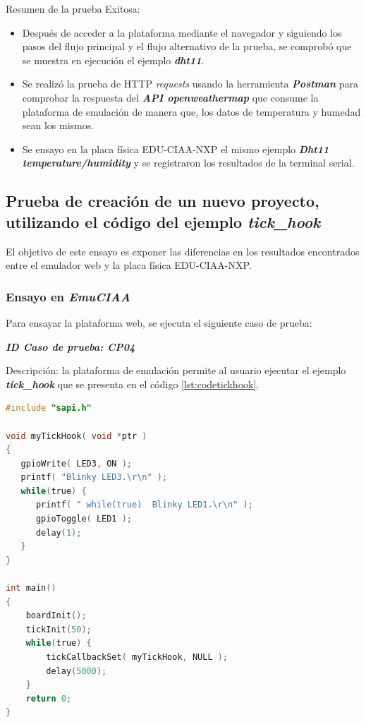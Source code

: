 Resumen de la prueba Exitosa:
\begin{itemize}
	\item Después de acceder a la plataforma mediante el navegador y siguiendo los pasos del flujo principal y el flujo alternativo de la prueba, se comprobó que se muestra en ejecución el ejemplo \textit{\textbf{dht11}}.
	\item Se realizó la prueba de HTTP \textit{requests} usando la herramienta \textit{\textbf{Postman}} para comprobar la respuesta del \textit{\textbf{API openweathermap}} que consume la plataforma de emulación de manera que, los datos de temperatura y humedad sean los mismos.
	\item Se ensayo en la placa física EDU-CIAA-NXP  el mismo ejemplo \textit{\textbf{Dht11 temperature/humidity}} y se registraron los resultados de la terminal serial.
\end{itemize}

\subsection{Prueba de creación de un nuevo proyecto, utilizando el código del ejemplo \textit{\textbf{tick\_hook}}}

El objetivo de este ensayo es exponer las diferencias en los resultados encontrados entre el emulador web y la placa física EDU-CIAA-NXP.

\subsubsection{Ensayo en \textit{EmuCIAA}} 

Para ensayar la plataforma web, se ejecuta el siguiente caso de prueba:

\textit{\textbf{ID Caso de prueba: CP04}}

Descripción: la plataforma de emulación permite al usuario ejecutar el ejemplo \textit{\textbf{tick\_hook}} que se presenta en el código \ref{lst:codetickhook}.

\begin{lstlisting}[caption={Nuevo proyecto, basado en el ejemplo tick\_hook},label={lst:codetickhook},language=C]
#include "sapi.h"

void myTickHook( void *ptr )
{
   gpioWrite( LED3, ON );
   printf( "Blinky LED3.\r\n" );
   while(true) {
      printf( " while(true)  Blinky LED1.\r\n" );
      gpioToggle( LED1 );
      delay(1);
   }
}

int main()
{
    boardInit();
    tickInit(50);
    while(true) {
        tickCallbackSet( myTickHook, NULL );
        delay(5000);
    }
    return 0;
}
\end{lstlisting}

